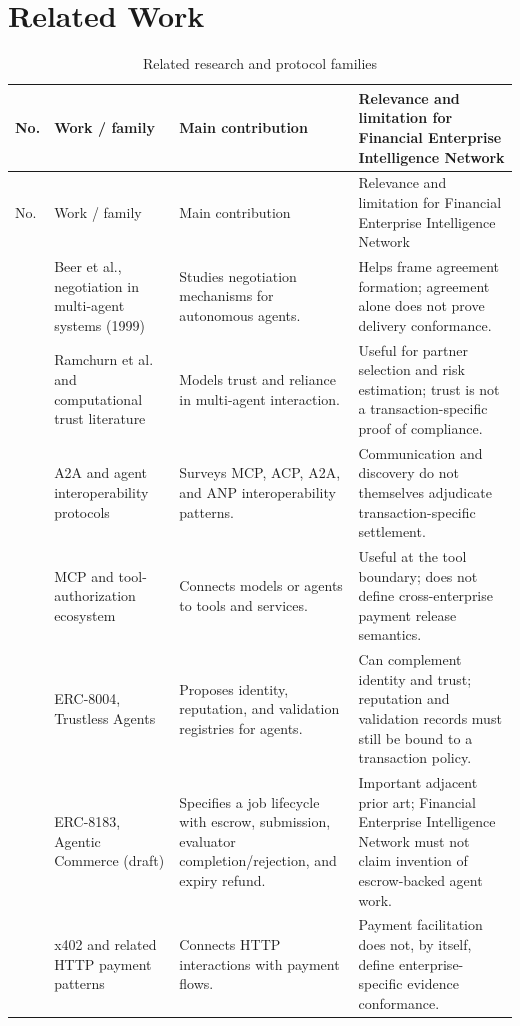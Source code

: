 \documentclass[12pt,a4paper,oneside]{report}
\begin{document}
\section{Related Work}
\begin{longtable}{>{\raggedright\arraybackslash}p{}>{\raggedright\arraybackslash}p{}>{\raggedright\arraybackslash}p{}>{\raggedright\arraybackslash}p{}}
\caption{Related research and protocol families}\\
\toprule
No. & Work / family & Main contribution & Relevance and limitation for Financial Enterprise Intelligence Network\\
\midrule
\endfirsthead
\toprule No. & Work / family & Main contribution & Relevance and limitation for Financial Enterprise Intelligence Network\\ \midrule
\endhead
1 & Beer et al., negotiation in multi-agent systems (1999) & Studies negotiation mechanisms for autonomous agents. & Helps frame agreement formation; agreement alone does not prove delivery conformance.\\
2 & Ramchurn et al. and computational trust literature & Models trust and reliance in multi-agent interaction. & Useful for partner selection and risk estimation; trust is not a transaction-specific proof of compliance.\\
3 & A2A and agent interoperability protocols \cite{ehtesham2025} & Surveys MCP, ACP, A2A, and ANP interoperability patterns. & Communication and discovery do not themselves adjudicate transaction-specific settlement.\\
4 & MCP and tool-authorization ecosystem & Connects models or agents to tools and services. & Useful at the tool boundary; does not define cross-enterprise payment release semantics.\\
5 & ERC-8004, Trustless Agents & Proposes identity, reputation, and validation registries for agents. & Can complement identity and trust; reputation and validation records must still be bound to a transaction policy.\\
6 & ERC-8183, Agentic Commerce (draft) & Specifies a job lifecycle with escrow, submission, evaluator completion/rejection, and expiry refund. & Important adjacent prior art; Financial Enterprise Intelligence Network must not claim invention of escrow-backed agent work.\\
7 & x402 and related HTTP payment patterns & Connects HTTP interactions with payment flows. & Payment facilitation does not, by itself, define enterprise-specific evidence conformance.\\

\end{longtable}
\end{document}
